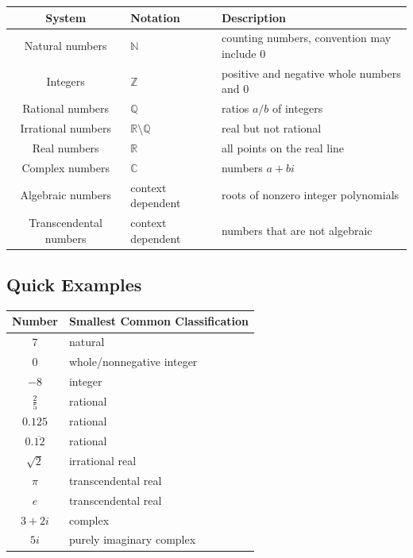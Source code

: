 \begin{center}
\begin{tabular}{c|l|l}
\textbf{System}
&
\textbf{Notation}
&
\textbf{Description}
\\ \hline
Natural numbers
&
\(\mathbb{N}\)
&
counting numbers, convention may include \(0\)
\\

Integers
&
\(\mathbb{Z}\)
&
positive and negative whole numbers and \(0\)
\\

Rational numbers
&
\(\mathbb{Q}\)
&
ratios \(a/b\) of integers
\\

Irrational numbers
&
\(\mathbb{R}\setminus\mathbb{Q}\)
&
real but not rational
\\

Real numbers
&
\(\mathbb{R}\)
&
all points on the real line
\\

Complex numbers
&
\(\mathbb{C}\)
&
numbers \(a+bi\)
\\

Algebraic numbers
&
context dependent
&
roots of nonzero integer polynomials
\\

Transcendental numbers
&
context dependent
&
numbers that are not algebraic
\end{tabular}
\end{center}

\subsection{Quick Examples}
\label{subsec:number-systems-quick-examples}

\begin{center}
\begin{tabular}{c|l}
\textbf{Number} & \textbf{Smallest Common Classification} \\ \hline
\(7\) & natural \\
\(0\) & whole/nonnegative integer \\
\(-8\) & integer \\
\(\frac25\) & rational \\
\(0.125\) & rational \\
\(0.\overline{12}\) & rational \\
\(\sqrt2\) & irrational real \\
\(\pi\) & transcendental real \\
\(e\) & transcendental real \\
\(3+2i\) & complex \\
\(5i\) & purely imaginary complex
\end{tabular}
\end{center}

